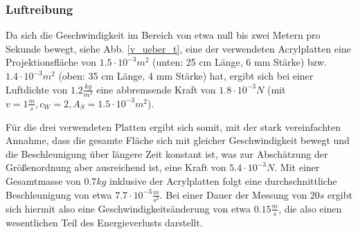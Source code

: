 \subsubsection{Luftreibung}
Da sich die Geschwindigkeit im Bereich von etwa null bis zwei Metern pro Sekunde bewegt, siehe Abb. \ref{v_ueber_t}, eine der verwendeten Acrylplatten eine Projektionsfläche von $ 1.5 \cdot 10^{-3} m^2$ (unten: 25 cm Länge, 6 mm Stärke) bzw. $ 1.4 \cdot 10^{-3} m^2$ (oben: 35 cm Länge, 4 mm Stärke) hat, ergibt sich bei einer Luftdichte von $ 1.2 \frac{kg}{m^2} $ eine abbremsende Kraft von $ 1.8 \cdot 10^{-3} N $ (mit $ v = 1 \frac{m}{s}, c_W = 2, A_S = 1.5 \cdot 10^{-3} m^2 $). 

Für die drei verwendeten Platten ergibt sich somit, mit der stark vereinfachten Annahme, dass die gesamte Fläche sich mit gleicher Geschwindigkeit bewegt und die Beschleunigung über längere Zeit konstant ist, was zur Abschätzung der Größenordnung aber ausreichend ist, eine Kraft von $ 5.4 \cdot 10^{-3}  N $. Mit einer Gesamtmasse von $0.7 kg$ inklusive der Acrylplatten folgt eine durchschnittliche Beschleunigung von etwa $ 7.7 \cdot 10^{-3} \frac{m}{s^2} $. Bei einer Dauer der Messung von $20 s$ ergibt sich hiermit also  eine Geschwindigkeitsänderung von etwa $ 0.15 \frac{m}{s} $, die also einen wesentlichen Teil des Energieverlusts darstellt. \\

